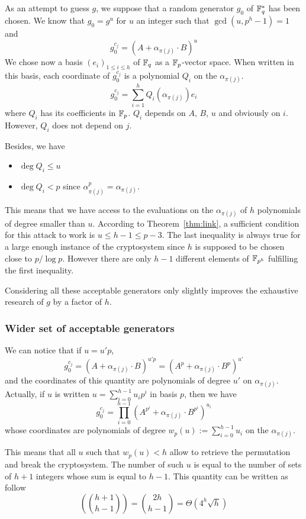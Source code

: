 \documentclass[a4paper]{article}
\newcommand{\GF}[1]{\F_{#1}}
\begin{document}
As an attempt to guess $g$, we suppose that a random generator $g_0$ of $\GF{q}^{*}$ has been chosen. We know that $g_0 = g^u$ for $u$ an integer such that $\gcd(u, p^h-1) = 1$ and
$$ g_0 ^{c_j} = (A + \alpha_{\pi(j)} \cdot B)^u $$
We chose now a basis $(e_i)_{1 \leq i \leq h}$ of $\GF{q}$ as a $\GF{p}$-vector space. When written in this basis, each coordinate of $g_0^{c_j}$ is a polynomial $Q_i$ on the $\alpha_{\pi(j)}$.
$$ g_0^{c_j} = \sum_{i=1}^h Q_i(\alpha_{\pi(j)}) e_i $$
where $Q_i$ has its coefficients in $\GF{p}$.
$Q_i$ depends on $A$, $B$, $u$ and obviously on $i$. However, $Q_i$ does not depend on $j$.

Besides, we have
\begin{itemize}
\item $\deg Q_i \leq u$
\item $\deg Q_i < p$ since $\alpha_{\pi(j)}^p = \alpha_{\pi(j)}$.
\end{itemize}

This means that we have access to the evaluations on the $\alpha_{\pi(j)}$ of $h$ polynomials of degree smaller than $u$. According to Theorem~\ref{thm:link}, a sufficient condition for this attack to work is $u \leq h-1 \leq p-3$. The last inequality is  always true for a large enough instance of the cryptosystem since $h$ is supposed to be chosen close to $p / \log p$. However there are only $h-1$ different elements of $\GF{p^h}$ fulfilling the first inequality.

Considering all these acceptable generators only slightly improves the exhaustive research of $g$ by a factor of $h$.


\subsubsection{Wider set of acceptable generators}

We can notice that if $u = u'p$,
$$ g_0^{c_j} = (A + \alpha_{\pi(j)} \cdot B)^{u'p} = (A^p + \alpha_{\pi(j)} \cdot B^p)^{u'} $$
and the coordinates of this quantity are polynomials of degree $u'$ on $\alpha_{\pi(j)}$.
Actually, if $u$ is written $u = \sum_{i=0}^{h-1} u_i p^i$ in basis $p$, then we have
$$ g_0^{c_j} = \prod_{i=0}^{h-1} (A^{p^i} + \alpha_{\pi(j)} \cdot B^{p^i} )^{u_i} $$
whose coordinates are polynomials of degree $w_p(u) := \sum_{i=0}^{h-1} u_i$ on the $\alpha_{\pi(j)}$.

This means that all $u$ such that $w_p(u) < h$ allow to retrieve the permutation and break the cryptosystem.
The number of such $u$ is equal to the number of sets of $h+1$ integers whose sum is equal to $h-1$. This quantity can be written as follow
$$ \left( \binom{h+1}{h-1} \right) = \binom{2h}{h-1} =\Theta\left( 4^h \sqrt{h} \right) $$
\end{document}
